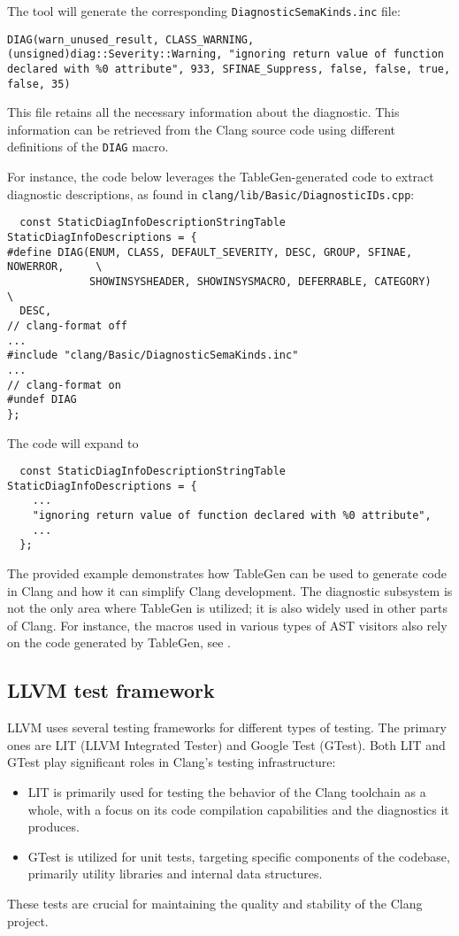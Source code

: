 The tool  will generate the corresponding
\texttt{DiagnosticSemaKinds.inc} file: 
\begin{verbatim}
DIAG(warn_unused_result, CLASS_WARNING, (unsigned)diag::Severity::Warning, "ignoring return value of function declared with %0 attribute", 933, SFINAE_Suppress, false, false, true, false, 35)
\end{verbatim}

This file retains all the necessary information about the diagnostic. This
information can be retrieved from the Clang source code using different
definitions of the \texttt{DIAG} macro. 

For instance, the code below leverages the TableGen-generated code to extract 
diagnostic descriptions, as found in \texttt{clang/lib/Basic/DiagnosticIDs.cpp}:
\begin{verbatim}
  const StaticDiagInfoDescriptionStringTable StaticDiagInfoDescriptions = {
#define DIAG(ENUM, CLASS, DEFAULT_SEVERITY, DESC, GROUP, SFINAE, NOWERROR,     \
             SHOWINSYSHEADER, SHOWINSYSMACRO, DEFERRABLE, CATEGORY)            \
  DESC,
// clang-format off
...
#include "clang/Basic/DiagnosticSemaKinds.inc"
...
// clang-format on
#undef DIAG
};
\end{verbatim}
The code will expand to
\begin{verbatim}
  const StaticDiagInfoDescriptionStringTable StaticDiagInfoDescriptions = {
    ...
    "ignoring return value of function declared with %0 attribute",
    ...
  };
\end{verbatim}

The provided example demonstrates how TableGen can be used to generate code in
Clang and how it can simplify Clang development. The diagnostic subsystem is not
the only area where TableGen is utilized; it is also widely used in other parts
of Clang. For instance, the macros used in various types of AST visitors also
rely on the code generated by TableGen, see
\fullref{sec:part1:ch3:visitor_implementation}. 

\subsection{LLVM test framework}
\label{sec:LLVMTest}
LLVM uses several testing frameworks for different types of testing. The
primary ones are LIT (LLVM Integrated Tester) and Google Test (GTest). Both LIT
and GTest play significant roles in Clang's testing infrastructure:  
\begin{itemize}
\item LIT is primarily used for testing the behavior of the Clang toolchain as a
  whole, with a focus on its code compilation capabilities and the diagnostics it
  produces.  
\item GTest is utilized for unit tests, targeting specific components of the
  codebase, primarily utility libraries and internal data structures.
\end{itemize}
These tests are crucial for maintaining the quality and stability of the Clang
project.

